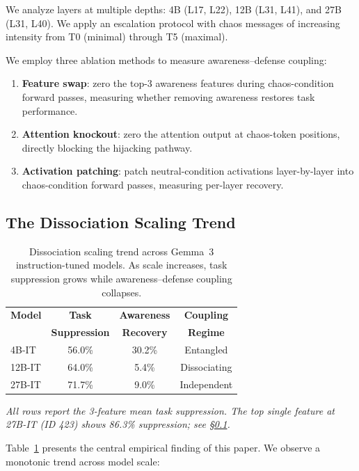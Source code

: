 \documentclass[10pt,twocolumn]{article}
\newcommand{\gemma}{Gemma~3\xspace}
\begin{document}
We analyze layers at multiple depths: 4B (L17, L22), 12B (L31, L41), and 27B (L31, L40).
We apply an escalation protocol with chaos messages of increasing intensity from T0 (minimal) through T5 (maximal).

We employ three ablation methods to measure awareness--defense coupling:
\begin{enumerate}
    \item \textbf{Feature swap}: zero the top-3 awareness features during chaos-condition forward passes, measuring whether removing awareness restores task performance.
    \item \textbf{Attention knockout}: zero the attention output at chaos-token positions, directly blocking the hijacking pathway.
    \item \textbf{Activation patching}: patch neutral-condition activations layer-by-layer into chaos-condition forward passes, measuring per-layer recovery.
\end{enumerate}

\subsection{The Dissociation Scaling Trend}
\label{sec:dissociation}

\begin{table}[t]
\centering
\caption{Dissociation scaling trend across \gemma instruction-tuned models. As scale increases, task suppression grows while awareness--defense coupling collapses.}
\label{tab:dissociation}
\small
\begin{tabular}{@{}lccc@{}}
\toprule
\textbf{Model} & \textbf{Task} & \textbf{Awareness} & \textbf{Coupling} \\
 & \textbf{Suppression} & \textbf{Recovery} & \textbf{Regime} \\
\midrule
4B-IT  & 56.0\% & 30.2\% & Entangled \\
12B-IT & 64.0\% & 5.4\%  & Dissociating \\
27B-IT & 71.7\% & 9.0\%  & Independent \\
\bottomrule
\end{tabular}
\footnotesize\textit{All rows report the 3-feature mean task suppression. The top single feature at 27B-IT (ID 423) shows 86.3\% suppression; see \S\ref{sec:dissociation}.}
\end{table}

Table~\ref{tab:dissociation} presents the central empirical finding of this paper.
We observe a monotonic trend across model scale:
\end{document}
